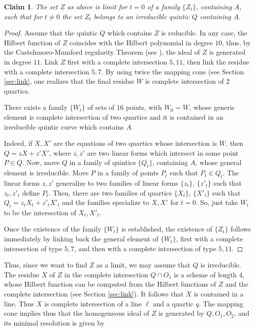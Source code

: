 \documentclass{amsart}
\newtheorem{claim0}[thm0]{Claim}
\theoremstyle{definition}
\begin{document}
\begin{claim0}\label{cl:opt}
The set $Z$ as above is limit for $t=0$ of a family  $\{Z_t\}$, containing $A$, such that for $t\neq 0$ the set $Z_t$ belongs to an irreducible quintic $Q$ containing $A$.
\end{claim0}
\begin{proof}
Assume that the quintic $Q$ which contains $Z$ is reducible.
In any case, the Hilbert function of $Z$ coincides with the Hilbert polynomial in degree $10$, thus, by the Castelnuovo-Mumford regularity 
Theorem (see \cite{Castelnuovo93}), the ideal of $Z$ is generated in degree $11$. Link $Z$ first with a complete intersection $5,11$, 
then link the residue with a complete intersection $5,7$.
By using twice the mapping cone (see Section \ref{sec:link}, one realizes that the final residue $W$ is complete intersection of $2$ quartics. 


There exists a family $\{W_t\}$ of sets of $16$ points, with $W_0=W$, whose generic element is complete intersection of two quartics and it 
is contained in an irreducible quintic curve which contains $A$.

 Indeed, if $X,X'$ are the equations of two quartics whose intersection is $W$,
then $Q=zX+z'X'$, where $z,z'$ are two linear forms which intersect in some point $P\in Q$. Now, move $Q$ in a family of quintics
$\{Q_t\}$, containing $A$, whose general element is irreducible. Move $P$ in a family of points $P_t$ such that $P_t\in Q_t$. The linear forms
$z,z'$ generalize to two families of linear forms $\{z_t\}$, $\{z'_t\}$ such that $z_t,z'_t$ define $P_t$. Then, there are two families of quartics
$\{X_t\}$, $\{X'_t\}$ such that $Q_t=z_tX_t+z'_tX'_t$ and the families specialize to $X,X'$ for $t=0$. So, just take $W_t$ to be the intersection of 
$X_t,X'_t$.

Once the existence of the family $\{W_t\}$ is established, the existence of $\{Z_t\}$ follows immediately by linking back  the general element
of $\{W_t\}$, first with a complete intersection of type $5,7$, and then with a complete intersection of type $5,11$.
\end{proof}


Thus, since we want to find $Z$ as a limit, we may assume that $Q$ is irreducible. The residue $X$ of $Z$ in the complete intersection $Q\cap O_1$ 
is a scheme of length $4$, whose Hilbert function can be computed from the Hilbert functions of $Z$ and the complete intersection (see Section \ref{sec:link}).
It follows that $X$ is contained in a line. Thus $X$ is complete intersection of a line $\ell$ and a quartic $q$. The mapping cone implies thus that 
the homogeneous  ideal of $Z$ is generated by $Q,O_1,O_2$, and its minimal resolution is given by 
\end{document}
